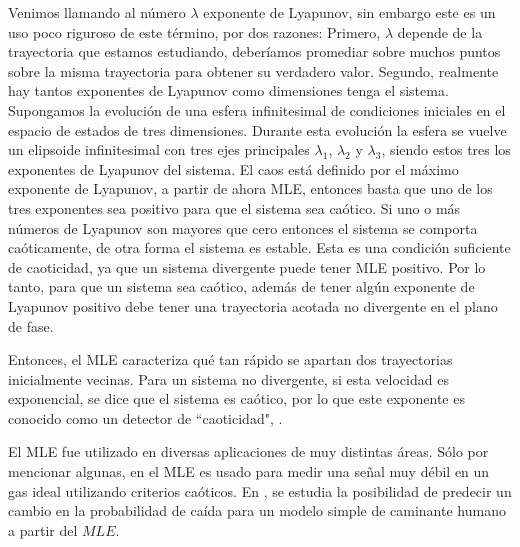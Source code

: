Venimos llamando al número $\lambda$ exponente de Lyapunov, sin embargo este es un uso poco riguroso de este término, por dos razones:
Primero, $\lambda$ depende de la trayectoria que estamos estudiando, deberíamos promediar sobre muchos puntos sobre la misma trayectoria para obtener su verdadero valor.
Segundo, realmente hay tantos exponentes de Lyapunov como dimensiones tenga el sistema.
Supongamos la evolución de una esfera infinitesimal de condiciones iniciales en el espacio de estados de tres dimensiones.
Durante esta evolución la esfera se vuelve un elipsoide infinitesimal con tres ejes principales $\lambda_1$, $\lambda_2$ y $\lambda_3$, siendo estos tres los exponentes de Lyapunov del sistema.
El caos está definido por el máximo exponente de Lyapunov, a partir de ahora MLE, entonces basta que uno de los tres exponentes sea positivo para que el sistema sea caótico.
Si uno o más números de Lyapunov son mayores que cero entonces el sistema se comporta caóticamente, de otra forma el sistema es estable.
Esta es una condición suficiente de caoticidad, ya que un sistema divergente puede tener MLE positivo.
Por lo tanto, para que un sistema sea caótico, además de tener algún exponente de Lyapunov positivo debe tener una trayectoria acotada no divergente en el plano de fase.

Entonces, el MLE caracteriza qué tan rápido se apartan dos trayectorias inicialmente vecinas.
Para un sistema no divergente, si esta velocidad es exponencial, se dice que el sistema es caótico, por lo que este exponente es conocido como un detector de  ``caoticidad", \cite{Strotgartz1994,Kantz1994,Sprott2003}.

El MLE fue utilizado en diversas aplicaciones de muy distintas áreas.
Sólo por mencionar algunas, en \cite{Ma2013} el MLE es usado para medir una señal muy débil en un gas ideal utilizando criterios caóticos.
En \cite{Bruijna2011}, se estudia la posibilidad de predecir un cambio en la probabilidad de caída para un modelo simple de caminante humano a partir del $MLE$.

